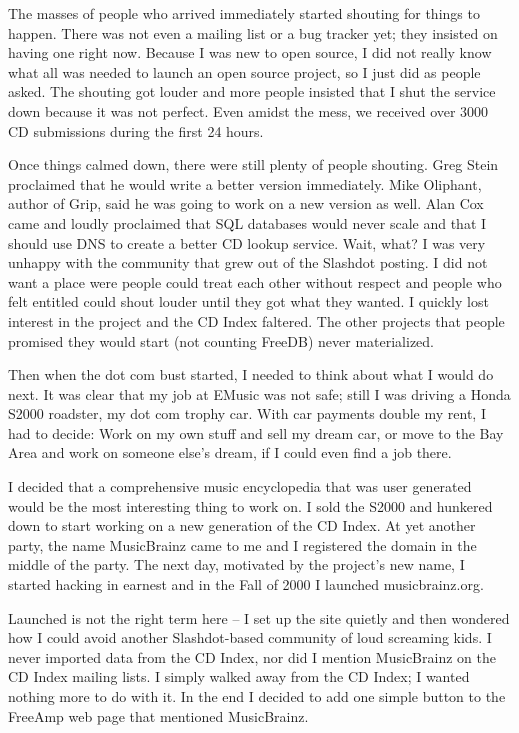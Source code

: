 The masses of people who arrived immediately started shouting for things to happen. There was not even a mailing list or a bug tracker yet; they insisted on having one right now. Because I was new to open source, I did not really know what all was needed to launch an open source project, so I just did as people asked.  The shouting got louder and more people insisted that I shut the service down because it was not perfect. Even amidst the mess, we received over 3000 CD submissions during the first 24 hours.

Once things calmed down, there were still plenty of people shouting. Greg Stein proclaimed that he would write a better version immediately. Mike Oliphant, author of Grip, said he was going to work on a new version as well. Alan Cox came and loudly proclaimed that SQL databases would never scale and that I should use DNS to create a better CD lookup service. Wait, what?
I was very unhappy with the community that grew out of the Slashdot posting. I did not want a place were people could treat each other without respect and people who felt entitled could shout louder until they got what they wanted. I quickly lost interest in the project and the CD Index faltered. The other projects that people promised they would start (not counting FreeDB) never materialized.

Then when the dot com bust started, I needed to think about what I would do next. It was clear that my job at EMusic was not safe; still I was driving a Honda S2000 roadster, my dot com trophy car. With car payments double my rent, I had to decide: Work on my own stuff and sell my dream car, or move to the Bay Area and work on someone else’s dream, if I could even find a job there.

I decided that a comprehensive music encyclopedia that was user generated would be the most interesting thing to work on. I sold the S2000 and hunkered down to start working on a new generation of the CD Index. At yet another party, the name MusicBrainz came to me and I registered the domain in the middle of the party. The next day, motivated by the project’s new name, I started hacking in earnest and in the Fall of 2000 I launched musicbrainz.org.

Launched is not the right term here -- I set up the site quietly and then wondered how I could avoid another Slashdot-based community of loud screaming kids. I never imported data from the CD Index, nor did I mention MusicBrainz on the CD Index mailing lists. I simply walked away from the CD Index; I wanted nothing more to do with it. In the end I decided to add one simple button to the FreeAmp web page that mentioned MusicBrainz.

